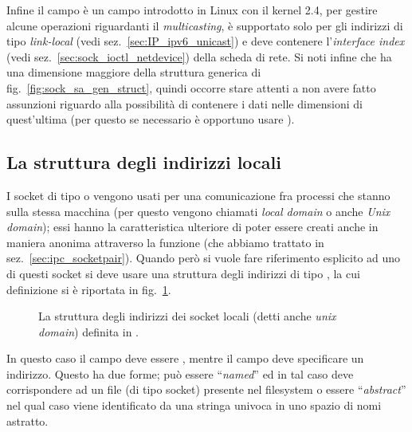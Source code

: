 Infine il campo  è un campo introdotto in Linux con il
kernel 2.4, per gestire alcune operazioni riguardanti il
\textit{multicasting}, è supportato solo per gli indirizzi di tipo
\textit{link-local} (vedi sez.~\ref{sec:IP_ipv6_unicast}) e deve contenere
l'\textit{interface index} (vedi sez.~\ref{sec:sock_ioctl_netdevice}) della
scheda di rete.  Si noti infine che  ha una dimensione
maggiore della struttura  generica di
fig.~\ref{fig:sock_sa_gen_struct}, quindi occorre stare attenti a non avere
fatto assunzioni riguardo alla possibilità di contenere i dati nelle
dimensioni di quest'ultima (per questo se necessario è opportuno usare
).


\subsection{La struttura degli indirizzi locali}
\label{sec:sock_sa_local}

I socket di tipo  o  vengono usati per una
comunicazione fra processi che stanno sulla stessa macchina (per questo
vengono chiamati \textit{local domain} o anche \textit{Unix domain}); essi
hanno la caratteristica ulteriore di poter essere creati anche in maniera
anonima attraverso la funzione  (che abbiamo trattato in
sez.~\ref{sec:ipc_socketpair}).  Quando però si vuole fare riferimento
esplicito ad uno di questi socket si deve usare una struttura degli indirizzi
di tipo , la cui definizione si è riportata in
fig.~\ref{fig:sock_sa_local_struct}.

\begin{figure}[!htb]
  \footnotesize \centering
  \begin{minipage}[c]{0.80\textwidth}
  \end{minipage} 
  \caption{La struttura  degli indirizzi dei socket
    locali (detti anche \textit{unix domain}) definita in
    .}
  \label{fig:sock_sa_local_struct}
\end{figure}

In questo caso il campo  deve essere ,
mentre il campo  deve specificare un indirizzo. Questo ha due
forme; può essere ``\textit{named}'' ed in tal caso deve corrispondere ad un
file (di tipo socket) presente nel filesystem o essere ``\textit{abstract}''
nel qual caso viene identificato da una stringa univoca in uno spazio di nomi
astratto. 

